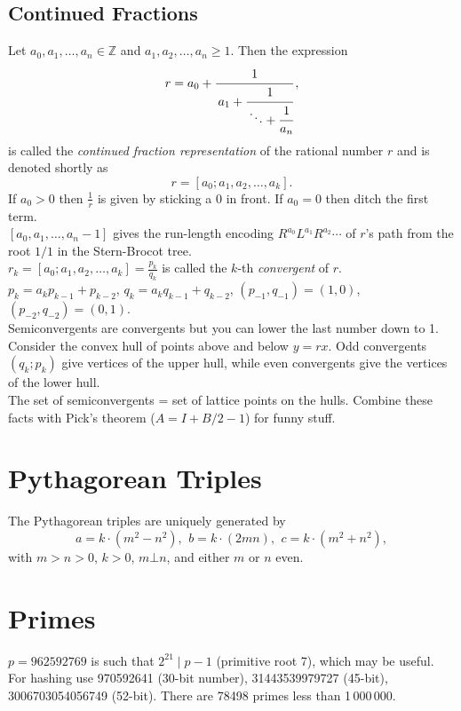 	\subsection{Continued Fractions}
	Let $a_0,a_1,\ldots,a_n\in\mathbb{Z}$ and $a_1,a_2,\ldots,a_n\ge 1$. Then the expression
	\[ r = a_0 + \cfrac{1}{\,a_1 + \cfrac{1}{\,\ddots + \cfrac{1}{a_n}}}\,, \]
	is called the \emph{continued fraction representation} of the rational number $r$
	and is denoted shortly as
	\[ r = [a_0; a_1, a_2, \ldots, a_k]. \]
	If $a_0 > 0$ then $\frac{1}{r}$ is given by sticking a $0$ in front. If $a_0 = 0$ then ditch the first term. \\ 
$[a_0, a_1, \dots, a_n - 1]$ gives the run-length encoding $R^{a_0}L^{a_1}R^{a_2}\cdots$ of $r$'s path from the root $1/1$ in the Stern-Brocot tree. \\ 
	$r_k = [a_0; a_1, a_2, \dots, a_k] = \frac{p_k}{q_k}$ is called the $k$-th \emph{convergent} of $r$. \\
	$p_k=a_kp_{k-1}+p_{k-2}$, $q_k=a_kq_{k-1}+q_{k-2}$, $(p_{-1},q_{-1})=(1,0)$, $(p_{-2},q_{-2})=(0,1)$. \\
	Semiconvergents are convergents but you can lower the last number down to 1. \\
	Consider the convex hull of points above and below $y = rx$. Odd convergents $(q_k; p_k)$ give vertices of the upper hull, while even convergents give the vertices of the lower hull. \\
	The set of semiconvergents = set of lattice points on the hulls. Combine these facts with Pick's theorem ($A = I + B/2 - 1$) for funny stuff. \\


\section{Pythagorean Triples}
 The Pythagorean triples are uniquely generated by
 \[ a=k\cdot (m^{2}-n^{2}),\ \,b=k\cdot (2mn),\ \,c=k\cdot (m^{2}+n^{2}), \]
 with $m > n > 0$, $k > 0$, $m \bot n$, and either $m$ or $n$ even.

\section{Primes}
	$p=962592769$ is such that $2^{21} \mid p-1$ (primitive root 7), which may be useful. For hashing
	use 970592641 (30-bit number), 31443539979727 (45-bit), 3006703054056749
	(52-bit). There are 78498 primes less than 1\,000\,000.

